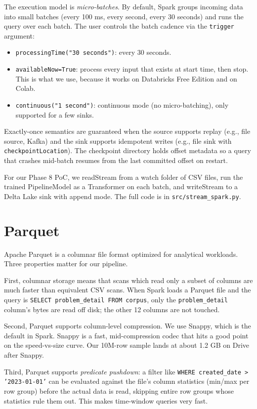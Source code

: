 \documentclass[11pt,letterpaper]{book}
\begin{document}
The execution model is \emph{micro-batches}. By default, Spark groups incoming data into small batches (every 100 ms, every second, every 30 seconds) and runs the query over each batch. The user controls the batch cadence via the \texttt{trigger} argument:
\begin{itemize}
\item \texttt{processingTime("30 seconds")}: every 30 seconds.
\item \texttt{availableNow=True}: process every input that exists at start time, then stop. This is what we use, because it works on Databricks Free Edition and on Colab.
\item \texttt{continuous("1 second")}: continuous mode (no micro-batching), only supported for a few sinks.
\end{itemize}
Exactly-once semantics are guaranteed when the source supports replay (e.g., file source, Kafka) and the sink supports idempotent writes (e.g., file sink with \texttt{checkpointLocation}). The checkpoint directory holds offset metadata so a query that crashes mid-batch resumes from the last committed offset on restart.

For our Phase 8 PoC, we readStream from a watch folder of CSV files, run the trained PipelineModel as a Transformer on each batch, and writeStream to a Delta Lake sink with append mode. The full code is in \texttt{src/stream\_spark.py}.

\section{Parquet}

Apache Parquet is a columnar file format optimized for analytical workloads. Three properties matter for our pipeline.

First, columnar storage means that scans which read only a subset of columns are much faster than equivalent CSV scans. When Spark loads a Parquet file and the query is \texttt{SELECT problem\_detail FROM corpus}, only the \texttt{problem\_detail} column's bytes are read off disk; the other 12 columns are not touched.

Second, Parquet supports column-level compression. We use Snappy, which is the default in Spark. Snappy is a fast, mid-compression codec that hits a good point on the speed-vs-size curve. Our 10M-row sample lands at about 1.2 GB on Drive after Snappy.

Third, Parquet supports \emph{predicate pushdown}: a filter like \texttt{WHERE created\_date > '2023-01-01'} can be evaluated against the file's column statistics (min/max per row group) before the actual data is read, skipping entire row groups whose statistics rule them out. This makes time-window queries very fast.
\end{document}

